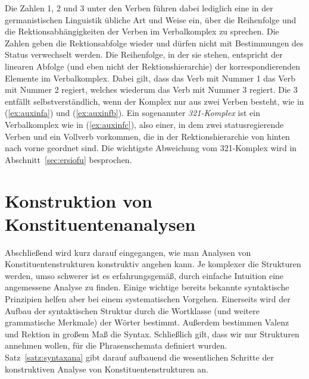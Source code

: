 Die Zahlen 1, 2 und 3 unter den Verben führen dabei lediglich eine in der germanistischen Linguistik übliche Art und Weise ein, über die Reihenfolge und die Rektionsabhängigkeiten der Verben im Verbalkomplex zu sprechen.
Die Zahlen geben die Rektionsabfolge wieder und dürfen nicht mit Bestimmungen des Status verwechselt werden.
Die Reihenfolge, in der sie stehen, entspricht der linearen Abfolge (und eben nicht der Rektionshierarchie) der korrespondierenden Elemente im Verbalkomplex.
Dabei gilt, dass das Verb mit Nummer 1 das Verb mit Nummer 2 regiert, welches wiederum das Verb mit Nummer 3 regiert.
Die 3 entfällt selbstverständlich, wenn der Komplex nur aus zwei Verben besteht, wie in (\ref{ex:auxinfa}) und (\ref{ex:auxinfb}).
Ein sogenannter \textit{321-Komplex} ist ein Verbalkomplex wie in (\ref{ex:auxinfc}), also einer, in dem zwei statusregierende Verben und ein Vollverb vorkommen, die in der Rektionshierarchie von hinten nach vorne geordnet sind.
Die wichtigste Abweichung vom 321-Komplex wird in Abschnitt~\ref{sec:ersiofu} besprochen.

\section{Konstruktion von Konstituentenanalysen}

\label{sec:syntaxana}

Abschließend wird kurz darauf eingegangen, wie man Analysen von Konstituentenstrukturen konstruktiv angehen kann.
Je komplexer die Strukturen werden, umso schwerer ist es erfahrungsgemäß, durch einfache Intuition eine angemessene Analyse zu finden.
Einige wichtige bereits bekannte syntaktische Prinzipien helfen aber bei einem systematischen Vorgehen.
Einerseits wird der Aufbau der syntaktischen Struktur durch die Wortklasse (und weitere grammatische Merkmale) der Wörter bestimmt.
Außerdem bestimmen Valenz und Rektion in großem Maß die Syntax.
Schließlich gilt, dass wir nur Strukturen annehmen wollen, für die Phrasenschemata definiert wurden.
Satz~\ref{satz:syntaxana} gibt darauf aufbauend die wesentlichen Schritte der konstruktiven Analyse von Konstituentenstrukturen an.



